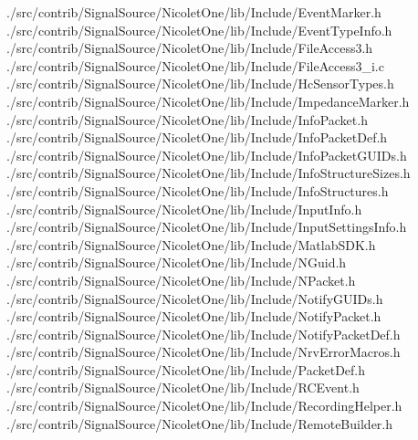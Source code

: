 \documentclass{wcletter}
\begin{document}
{	./src/contrib/SignalSource/NicoletOne/lib/Include/EventMarker.h \\ 
	./src/contrib/SignalSource/NicoletOne/lib/Include/EventTypeInfo.h \\ 
	./src/contrib/SignalSource/NicoletOne/lib/Include/FileAccess3.h \\ 
	./src/contrib/SignalSource/NicoletOne/lib/Include/FileAccess3\_i.c \\ 
	./src/contrib/SignalSource/NicoletOne/lib/Include/HcSensorTypes.h \\ 
	./src/contrib/SignalSource/NicoletOne/lib/Include/ImpedanceMarker.h \\ 
	./src/contrib/SignalSource/NicoletOne/lib/Include/InfoPacket.h \\ 
	./src/contrib/SignalSource/NicoletOne/lib/Include/InfoPacketDef.h \\ 
	./src/contrib/SignalSource/NicoletOne/lib/Include/InfoPacketGUIDs.h \\ 
	./src/contrib/SignalSource/NicoletOne/lib/Include/InfoStructureSizes.h \\ 
	./src/contrib/SignalSource/NicoletOne/lib/Include/InfoStructures.h \\ 
	./src/contrib/SignalSource/NicoletOne/lib/Include/InputInfo.h \\ 
	./src/contrib/SignalSource/NicoletOne/lib/Include/InputSettingsInfo.h \\ 
	./src/contrib/SignalSource/NicoletOne/lib/Include/MatlabSDK.h \\ 
	./src/contrib/SignalSource/NicoletOne/lib/Include/NGuid.h \\ 
	./src/contrib/SignalSource/NicoletOne/lib/Include/NPacket.h \\ 
	./src/contrib/SignalSource/NicoletOne/lib/Include/NotifyGUIDs.h \\ 
	./src/contrib/SignalSource/NicoletOne/lib/Include/NotifyPacket.h \\ 
	./src/contrib/SignalSource/NicoletOne/lib/Include/NotifyPacketDef.h \\ 
	./src/contrib/SignalSource/NicoletOne/lib/Include/NrvErrorMacros.h \\ 
	./src/contrib/SignalSource/NicoletOne/lib/Include/PacketDef.h \\ 
	./src/contrib/SignalSource/NicoletOne/lib/Include/RCEvent.h \\ 
	./src/contrib/SignalSource/NicoletOne/lib/Include/RecordingHelper.h \\ 
	./src/contrib/SignalSource/NicoletOne/lib/Include/RemoteBuilder.h \\ 
}
\end{document}
